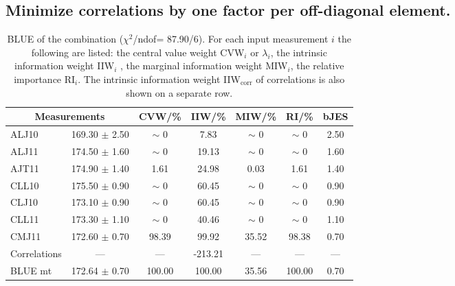 \subsection{Minimize correlations by one factor per off-diagonal element.}
\begin{table}[H]
\scriptsize
\begin{center}
\renewcommand{\arraystretch}{1.1}
\begin{tabular}{|lc|c|c|c|c|c|}
\hline
\multicolumn{2}{|c|}{Measurements} & CVW/\%  & IIW/\%  & MIW/\%  & RI/\%  & {\tiny bJES}\\
\hline
ALJ10 &     169.30 $\pm$       2.50 &  {\tiny $\sim$ }0 &       7.83 &  {\tiny $\sim$ }0 &  {\tiny $\sim$ }0 &       2.50\\
ALJ11 &     174.50 $\pm$       1.60 &  {\tiny $\sim$ }0 &      19.13 &  {\tiny $\sim$ }0 &  {\tiny $\sim$ }0 &       1.60\\
AJT11 &     174.90 $\pm$       1.40 &       1.61 &      24.98 &       0.03 &       1.61 &       1.40\\
CLL10 &     175.50 $\pm$       0.90 &  {\tiny $\sim$ }0 &      60.45 &  {\tiny $\sim$ }0 &  {\tiny $\sim$ }0 &       0.90\\
CLJ10 &     173.10 $\pm$       0.90 &  {\tiny $\sim$ }0 &      60.45 &  {\tiny $\sim$ }0 &  {\tiny $\sim$ }0 &       0.90\\
CLL11 &     173.30 $\pm$       1.10 &  {\tiny $\sim$ }0 &      40.46 &  {\tiny $\sim$ }0 &  {\tiny $\sim$ }0 &       1.10\\
CMJ11 &     172.60 $\pm$       0.70 &      98.39 &      99.92 &      35.52 &      98.38 &       0.70\\
Correlations & --- & --- &    -213.21 & --- & --- & ---\\
\hline
BLUE {\tiny mt} &     172.64 $\pm$       0.70 &     100.00 &     100.00 &      35.56 &     100.00 &       0.70\\
\hline
\end{tabular}
\caption{BLUE of the combination ($\chi^2$/ndof=     87.90/6).
 For each input measurement $i$ the following are listed: the central value weight CVW$_i$ or $\lambda_i$, the intrinsic information weight IIW$_i$ , the marginal information weight MIW$_i$, the relative importance RI$_i$. The intrinsic information weight IIW$_{\mathrm{corr}}$ of correlations is also shown on a separate row.}
\renewcommand{\arraystretch}{1}
\end{center}
\end{table}
